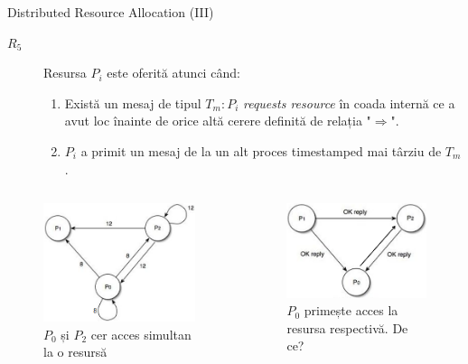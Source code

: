 \documentclass[9pt]{beamer}
\begin{document}
\begin{frame}{Distributed Resource Allocation (III)}
    \begin{description}
        \item[$R_5$] Resursa $P_i$ este oferită atunci când:
        \begin{enumerate}
        \item Există un mesaj de tipul $T_m:P_i$ \textit{requests resource} în coada internă ce a avut loc înainte de orice altă cerere definită de relația "$\Rightarrow$".
        \item $P_i$ a primit un mesaj de la un alt proces timestamped mai târziu de $T_m$.
        \end{enumerate}
    \end{description}
    \centering
    \begin{columns}
        \begin{figure}[h]
            \centering
            \includegraphics[scale=0.4]{figures/dra1}
            \caption{$P_0$ și $P_2$ cer acces simultan la o resursă}
            \label{fig:res1}
        \end{figure}
        \begin{figure}[h]
            \centering
            \includegraphics[scale=0.4]{figures/dra2}
            \caption{$P_0$ primește acces la resursa respectivă. De ce?}
            \label{fig:res2}
        \end{figure}
    \end{columns}
\end{frame}
\end{document}
